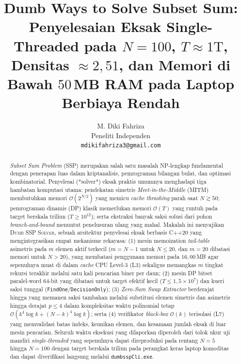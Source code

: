 \documentclass[journal,onecolumn,11pt]{IEEEtran}
\begin{document}
\title{Dumb Ways to Solve Subset Sum: Penyelesaian Eksak Single-Threaded pada $N = 100$, $T \approx 1\text{T}$, Densitas $\approx 2{,}51$, dan Memori di Bawah $50$\,MB RAM pada Laptop Berbiaya Rendah}

\author{M. Diki Fahriza\\
Peneliti Independen\\
\texttt{mdikifahriza3@gmail.com}}

\maketitle

\begin{abstract}
\textit{Subset Sum Problem} (SSP) merupakan salah satu masalah NP-lengkap fundamental dengan penerapan luas dalam kriptanalisis, pemrograman bilangan bulat, dan optimasi kombinatorial. Penyelesai (*solver*) eksak praktis umumnya menghadapi tiga hambatan komputasi utama: pendekatan simetris \textit{Meet-in-the-Middle} (MITM) membutuhkan memori $\mathcal{O}(2^{N/2})$ yang memicu \textit{cache thrashing} parah saat $N \gtrsim 50$; pemrograman dinamis (DP) klasik memerlukan memori $\mathcal{O}(T)$ yang runtuh pada target berskala triliun ($T \ge 10^{12}$); serta ekstraksi banyak saksi solusi dari pohon \textit{branch-and-bound} menuntut penelusuran ulang yang mahal. Makalah ini menyajikan \textsc{Dumb SSP Solver}, sebuah arsitektur penyelesai eksak berbasis C++20 yang mengintegrasikan empat mekanisme rekayasa: (1) mesin memoization \textit{tail-table} asimetris pada $m$ elemen aktif terkecil ($m = N-1$ untuk $N \le 20$, dan $m = 20$ dibatasi memori untuk $N > 20$), yang membatasi penggunaan memori pada $16{,}00$\,MB agar sepenuhnya muat di dalam \textit{cache} CPU Level-3 (L3) sekaligus memangkas $m$ tingkat rekursi terakhir melalui satu kali pencarian biner per daun; (2) mesin DP bitset paralel-word $64$-bit yang dibatasi untuk target efektif kecil ($T \le 1{,}5\times10^{7}$) dan kueri saksi tunggal (\texttt{FindOne}/\texttt{DecisionOnly}); (3) \textit{Zero-Sum Swap Extractor} berderajat hingga yang memanen saksi tambahan melalui substitusi elemen simetris dan asimetris hingga derajat $p \le 4$ dalam kompleksitas waktu polinomial tetap $\mathcal{O}(k^4\log k + (N-k)^4\log k)$; serta (4) verifikator \textit{black-box} $\mathcal{O}(k)$ terisolasi (L7) yang memvalidasi batas indeks, keunikan elemen, dan kesamaan jumlah eksak di luar mesin pencarian. Seluruh waktu eksekusi yang dilaporkan diperoleh dari tolok ukur uji mandiri \textit{single-threaded} yang sepenuhnya dapat direproduksi pada rentang $N=5$ hingga $N=100$ dengan target berskala triliun pada perangkat keras laptop komoditas dan dapat diverifikasi langsung melalui \texttt{dumbsspCli.exe}.
\end{abstract}
\end{document}
